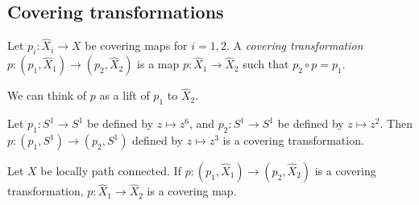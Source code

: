 \subsection{Covering transformations}
\begin{definition}
	Let \( p_i \colon \hat X_i \to X \) be covering maps for \( i = 1, 2 \).
	A \emph{covering transformation} \( p \colon (p_1,\hat X_1) \to (p_2,\hat X_2) \) is a map \( p \colon \hat X_1 \to \hat X_2 \) such that \( p_2 \circ p = p_1 \).
	\begin{center}
	\end{center}
\end{definition}
\begin{remark}
	We can think of \( p \) as a lift of \( p_1 \) to \( \hat X_2 \).
	\begin{center}
	\end{center}
\end{remark}
\begin{example}
	Let \( p_1 \colon S^1 \to S^1 \) be defined by \( z \mapsto z^6 \), and \( p_2 \colon S^1 \to S^1 \) be defined by \( z \mapsto z^2 \).
	Then \( p \colon (p_1, S^1) \to (p_2,S^1) \) defined by \( z \mapsto z^3 \) is a covering transformation.
	\begin{center}
	\end{center}
\end{example}
\begin{lemma}
	Let \( X \) be locally path connected.
	If \( p \colon (p_1,\hat X_1) \to (p_2,\hat X_2) \) is a covering transformation, \( p \colon \hat X_1 \to \hat X_2 \) is a covering map.
	\begin{center}
	\end{center}
\end{lemma}
